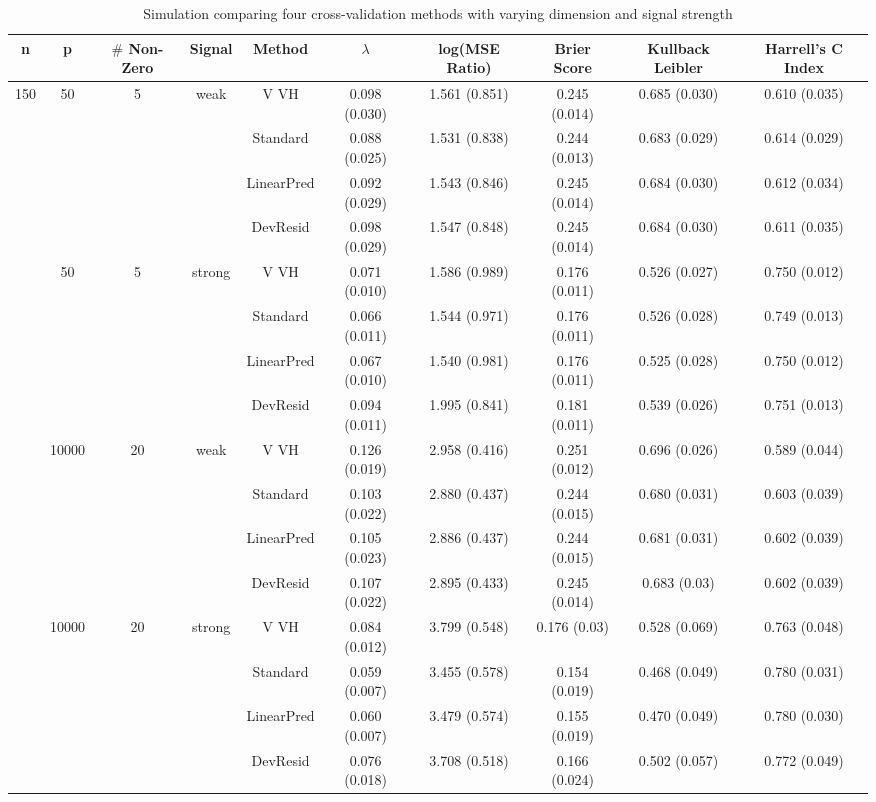 \begin{table}[htb]

\setlength{\tabcolsep}{3pt}

\caption{\label{Tab:sim} Simulation comparing four cross-validation methods with varying dimension and signal strength}
\centering
\begin{tabular}[t]{cccccccccc}
\toprule
 n& p& $\#$ Non-Zero & Signal & Method & $\lambda$ & log(MSE Ratio) &Brier Score & Kullback Leibler & Harrell's C Index\\
\midrule
150 & 50 & 5 & weak & V VH  & 0.098 (0.030) & 1.561 (0.851) & 0.245 (0.014) & 0.685 (0.030) & 0.610 (0.035) \\
    &    &   &     & Standard  & 0.088 (0.025) & 1.531 (0.838) & 0.244 (0.013) & 0.683 (0.029) & 0.614 (0.029) \\
    &    &   &     & LinearPred  & 0.092 (0.029) & 1.543 (0.846) & 0.245 (0.014) & 0.684 (0.030) & 0.612 (0.034) \\
    &    &   &     & DevResid  & 0.098 (0.029) & 1.547 (0.848) & 0.245 (0.014) & 0.684 (0.030) & 0.611 (0.035) \\
\addlinespace
150 & 50 & 5 & strong & V VH  & 0.071 (0.010) & 1.586 (0.989) & 0.176 (0.011) & 0.526 (0.027) & 0.750 (0.012) \\
    &    &   &     & Standard  & 0.066 (0.011) & 1.544 (0.971) & 0.176 (0.011) & 0.526 (0.028) & 0.749 (0.013) \\
    &    &   &     & LinearPred  & 0.067 (0.010) & 1.540 (0.981) & 0.176 (0.011) & 0.525 (0.028) & 0.750 (0.012) \\
    &    &   &     & DevResid  & 0.094 (0.011) & 1.995 (0.841) & 0.181 (0.011) & 0.539 (0.026) & 0.751 (0.013) \\
\addlinespace
400 & 10000 & 20 & weak & V VH  & 0.126 (0.019) & 2.958 (0.416) & 0.251 (0.012) & 0.696 (0.026) & 0.589 (0.044) \\
    &    &   &     & Standard  & 0.103 (0.022) & 2.880 (0.437) & 0.244 (0.015) & 0.680 (0.031) & 0.603 (0.039) \\
    &    &   &     & LinearPred  & 0.105 (0.023) & 2.886 (0.437) & 0.244 (0.015) & 0.681 (0.031) & 0.602 (0.039) \\
    &    &   &     & DevResid  & 0.107 (0.022) & 2.895 (0.433) & 0.245 (0.014) & 0.683 (0.03) & 0.602 (0.039) \\
\addlinespace
400 & 10000 & 20 & strong & V VH  & 0.084 (0.012) & 3.799 (0.548) & 0.176 (0.03) & 0.528 (0.069) & 0.763 (0.048) \\
    &    &   &     & Standard  & 0.059 (0.007) & 3.455 (0.578) & 0.154 (0.019) & 0.468 (0.049) & 0.780 (0.031) \\
    &    &   &     & LinearPred  & 0.060 (0.007) & 3.479 (0.574) & 0.155 (0.019) & 0.470 (0.049) & 0.780 (0.030) \\
    &    &   &     & DevResid  & 0.076 (0.018) & 3.708 (0.518) & 0.166 (0.024) & 0.502 (0.057) & 0.772 (0.049) \\
\bottomrule
\end{tabular}
\end{table}

